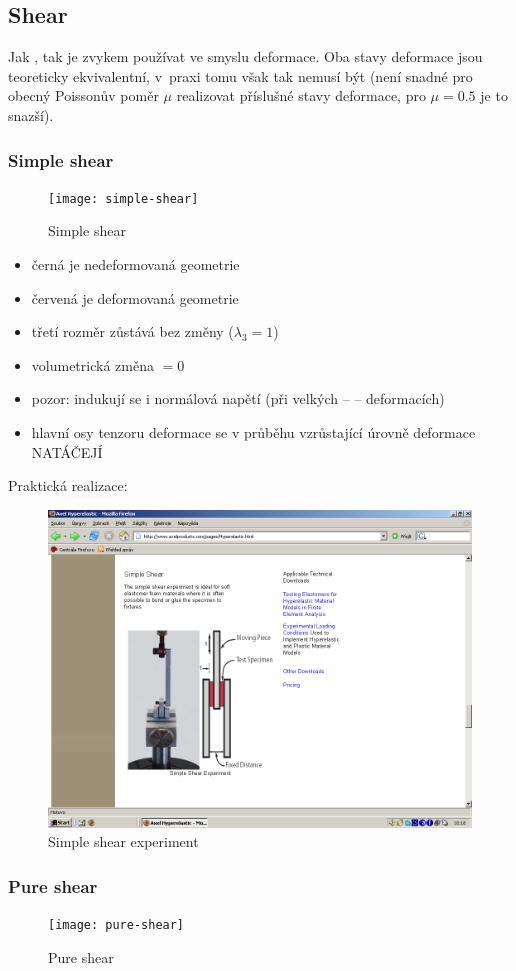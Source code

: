 
\subsection{Shear}
Jak , tak  je zvykem používat ve smyslu deformace. Oba stavy deformace jsou teoreticky ekvivalentní, v~praxi tomu však tak nemusí být (není snadné pro obecný Poissonův poměr $\mu$ realizovat příslušné stavy deformace, pro $\mu = \num{0.5}$ je to snazší).

\subsubsection{Simple shear}
\begin{figure}[H]
	\centering
	\texttt{[image: simple-shear]}
	\caption{Simple shear}
	\label{fig:simple-shear}
\end{figure}

\begin{itemize}
	\item černá je nedeformovaná geometrie
	\item červená je deformovaná geometrie
	\item třetí rozměr zůstává bez změny ($\lambda_3 = 1$)
	\item volumetrická změna $= 0$
	\item pozor: indukují se i normálová napětí (při velkých --  -- deformacích)
	\item hlavní osy tenzoru deformace se v průběhu vzrůstající úrovně deformace NATÁČEJÍ
\end{itemize}

Praktická realizace:
\begin{figure}[H]
	\centering
	\includegraphics[width=0.4\linewidth]{Obrazky/simple-shear-experiment}
	\caption{Simple shear experiment}
	\label{fig:simple-shear-experiment}
\end{figure}

\subsubsection{Pure shear}
\begin{figure}[H]
	\centering
	\texttt{[image: pure-shear]}
	\caption{Pure shear}
	\label{fig:pure-shear}
\end{figure}

